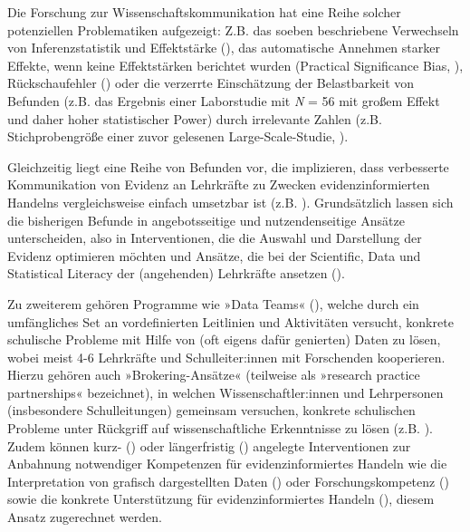 \documentclass[
  man,
  floatsintext,
  longtable,
  nolmodern,
  notxfonts,
  notimes,
  colorlinks=true,linkcolor=blue,citecolor=blue,urlcolor=blue]{apa7}
\begin{document}
Die Forschung zur Wissenschaftskommunikation hat eine Reihe solcher
potenziellen Problematiken aufgezeigt: Z.B. das soeben beschriebene
Verwechseln von Inferenzstatistik und Effektstärke
(), das automatische
Annehmen starker Effekte, wenn keine Effektstärken berichtet wurden
(Practical Significance Bias, ), Rückschaufehler () oder die verzerrte Einschätzung der Belastbarkeit von
Befunden (z.B. das Ergebnis einer Laborstudie mit \emph{N} = 56 mit
großem Effekt und daher hoher statistischer Power) durch irrelevante
Zahlen (z.B. Stichprobengröße einer zuvor gelesenen Large-Scale-Studie,
).

Gleichzeitig liegt eine Reihe von Befunden vor, die implizieren, dass
verbesserte Kommunikation von Evidenz an Lehrkräfte zu Zwecken
evidenzinformierten Handelns vergleichsweise einfach umsetzbar ist (z.B.
). Grundsätzlich
lassen sich die bisherigen Befunde in angebotsseitige und
nutzendenseitige Ansätze unterscheiden, also in Interventionen, die die
Auswahl und Darstellung der Evidenz optimieren möchten und Ansätze, die
bei der Scientific, Data und Statistical Literacy der (angehenden)
Lehrkräfte ansetzen ().

Zu zweiterem gehören Programme wie »Data Teams«
(), welche durch
ein umfängliches Set an vordefinierten Leitlinien und Aktivitäten
versucht, konkrete schulische Probleme mit Hilfe von (oft eigens dafür
genierten) Daten zu lösen, wobei meist 4-6 Lehrkräfte und
Schulleiter:innen mit Forschenden kooperieren. Hierzu gehören auch
»Brokering-Ansätze« (teilweise als »research practice partnerships«
bezeichnet), in welchen Wissenschaftler:innen und Lehrpersonen
(insbesondere Schulleitungen) gemeinsam versuchen, konkrete schulischen
Probleme unter Rückgriff auf wissenschaftliche Erkenntnisse zu lösen
(z.B. ). Zudem
können kurz- () oder
längerfristig () angelegte
Interventionen zur Anbahnung notwendiger Kompetenzen für
evidenzinformiertes Handeln wie die Interpretation von grafisch
dargestellten Daten () oder
Forschungskompetenz () sowie die konkrete Unterstützung für evidenzinformiertes Handeln
(),
diesem Ansatz zugerechnet werden.
\end{document}
